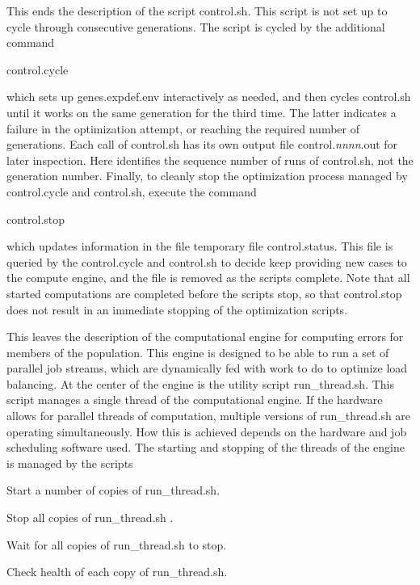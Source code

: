 \documentclass[12pt]{article}
\newcommand{\file}{\sf}
\newenvironment{flist2}{\begin{list}{nofile ?}{\parsep 0mm
            \itemsep 0mm \leftmargin 45mm \labelwidth 35mm
            \rightmargin 10mm}}{\end{list}}
\newcommand{\fit}[2]{\item[{\file{#1}}\hfill]{#2}}
\begin{document}
This ends the description of the script {\file control.sh}. This script is not
set up to cycle through consecutive generations. The script is cycled by the
additional command
\begin{center}
{\file control.cycle}
\end{center}
\noindent
which sets up {\file genes.expdef.env} interactively as needed, and then
cycles {\file control.sh} until it works on the same generation for the third
time. The latter indicates a failure in the optimization attempt, or reaching
the required number of generations. Each call of {\file control.sh} has its
own output file {\file control.{\it nnnn}.out} for later inspection. Here
{\file {\it nnnn}} identifies the sequence number of runs of {\file
control.sh}, not the generation number. Finally, to cleanly stop the
optimization process managed by {\file control.cycle} and {\file control.sh},
execute the command 
\begin{center}
{\file control.stop}
\end{center}
\noindent
which updates information in the file temporary file {\file control.status}.
This file is queried by the {\file control.cycle} and {\file control.sh} to
decide keep providing new cases to the compute engine, and the file is removed
as the scripts complete. Note that all started computations are completed
before the scripts stop, so that {\file control.stop} does not result in an
immediate stopping of the optimization scripts.

\vspace{\baselineskip}
\noindent
This leaves the description of the computational engine for computing errors
for members of the population. This engine is designed to be able to run a set
of parallel job streams, which are dynamically fed with work to do to optimize
load balancing. At the center of the engine is the utility script {\file
run\_thread.sh}. This script manages a single thread of the computational
engine. If the hardware allows for parallel threads of computation, multiple
versions of {\file run\_thread.sh} are operating simultaneously. How this is
achieved depends on the hardware and job scheduling software used. The
starting and stopping of the threads of the engine is managed by the scripts

\begin{flist2}
\fit{thread\_start.sh}{Start a number of copies of {\file run\_thread.sh}.}
\fit{thread\_stop.sh}{Stop all copies of {\file run\_thread.sh} .}
\fit{thread\_wait.sh}{Wait for all copies of {\file run\_thread.sh} to stop.}
\fit{thread\_check.sh}{Check health of each copy of {\file run\_thread.sh}.}
\end{flist2}
\end{document}
